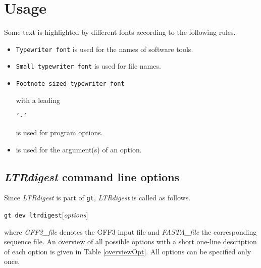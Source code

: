 \documentclass[12pt,titlepage]{article}
\newcommand{\LTRdigest}{\textit{LTRdigest}\xspace}
\newcommand{\GtLTRdigest}{\texttt{gt dev ltrdigest}\xspace}
\newcommand{\Gt}{\texttt{gt}\xspace}
\begin{document}
\section{Usage} \label{Usage}

Some text is highlighted by different fonts according to the following rules.

\begin{itemize}
\item \texttt{Typewriter font} is used for the names of software tools.
\item \texttt{\small{Small typewriter font}} is used for file names.
\item \begin{footnotesize}\texttt{Footnote sized typewriter font}
      \end{footnotesize} with a leading
      \begin{footnotesize}\texttt{'-'}\end{footnotesize}
      is used for program options.
\item {} is used for the argument(s) of an
      option.
\end{itemize}

\subsection{\LTRdigest command line options}

Since \LTRdigest is part of \Gt, \LTRdigest is called as follows.

\GtLTRdigest  $[$\emph{options}$]$  

where \emph{GFF3\_file} denotes the GFF3 input file and  \emph{FASTA\_file} the corresponding sequence file.
An overview of all possible options with a short one-line description of
each option is given in Table \ref{overviewOpt}.
All options can be specified only once.
\end{document}
